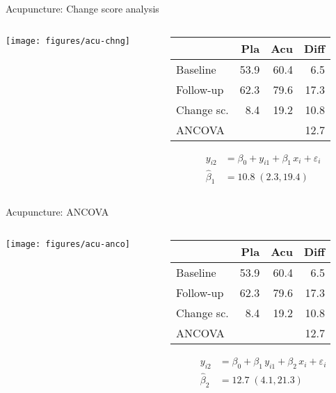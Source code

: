 \documentclass{beamer}
\begin{document}
\begin{frame}{Acupuncture: Change score analysis}
\begin{columns}[T]
\begin{column}{5.5cm}
  \texttt{[image: figures/acu-chng]}
\end{column}
%
\begin{column}{5.5cm}
  \vspace*{1em}\small
  \begin{tabular}{lrrr}
  \hline
             &  Pla &  Acu & Diff \\ \hline
  Baseline   & 53.9 & 60.4 &  6.5 \\
  Follow-up  & 62.3 & 79.6 & 17.3 \\
  Change sc. &  8.4 & 19.2 & 10.8 \\
  ANCOVA     &      &      & 12.7 \\ \hline
  \end{tabular}
\begin{align*}
         y_{i2} &= \beta_0 + y_{i1} + \beta_1 \, x_i + \varepsilon_i \\
  \hat{\beta}_1 &= 10.8 \; (2.3, 19.4)
\end{align*}
\end{column}
\end{columns}
\end{frame}


\begin{frame}{Acupuncture: ANCOVA}
\begin{columns}[T]
\begin{column}{5.5cm}
  \texttt{[image: figures/acu-anco]}
\end{column}
%
\begin{column}{5.5cm}
  \vspace*{1em}\small
  \begin{tabular}{lrrr}
  \hline
             &  Pla &  Acu & Diff \\ \hline
  Baseline   & 53.9 & 60.4 &  6.5 \\
  Follow-up  & 62.3 & 79.6 & 17.3 \\
  Change sc. &  8.4 & 19.2 & 10.8 \\
  ANCOVA     &      &      & 12.7 \\ \hline
  \end{tabular}
\begin{align*}
         y_{i2} &= \beta_0 + \beta_1 \, y_{i1} + \beta_2 \, x_i +
                    \varepsilon_i \\
  \hat{\beta}_2 &= 12.7 \; (4.1, 21.3)
\end{align*}
\end{column}
\end{columns}
\end{frame}
\end{document}
